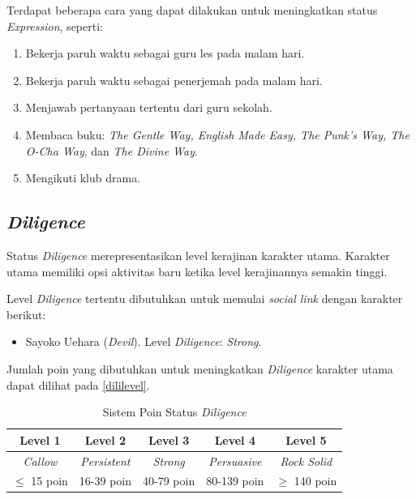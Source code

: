 Terdapat beberapa cara yang dapat dilakukan untuk meningkatkan status \textit{Expression}, seperti:
\begin{enumerate}
    \item Bekerja paruh waktu sebagai guru les pada malam hari.
    \item Bekerja paruh waktu sebagai penerjemah pada malam hari.
    \item Menjawab pertanyaan tertentu dari guru sekolah.
    \item Membaca buku: \textit{The Gentle Way, English Made Easy, The Punk’s Way, The O-Cha Way}, dan \textit{The Divine Way}.
    \item Mengikuti klub drama.
\end{enumerate}

\subsection{\textit{Diligence}}
Status \textit{Diligence} merepresentasikan level kerajinan karakter utama. Karakter utama memiliki opsi aktivitas baru ketika level kerajinannya semakin tinggi.

Level \textit{Diligence} tertentu dibutuhkan untuk memulai \textit{social link} dengan karakter berikut:
\begin{itemize}
    \item Sayoko Uehara (\textit{Devil}). Level \textit{Diligence}: \textit{Strong}.
\end{itemize}

Jumlah poin yang dibutuhkan untuk meningkatkan \textit{Diligence} karakter utama dapat dilihat pada \autoref{dililevel}.
\begin{table}[H]
    \caption{\label{dililevel}Sistem Poin Status \textit{Diligence}}
    \begin{center}
        \begin{tabular}{ | c | c | c | c | c | }
            \hline
            \textbf{Level 1} & \textbf{Level 2}    & \textbf{Level 3} & \textbf{Level 4}    & \textbf{Level 5}    \\
            \hline
            \textit{Callow}  & \textit{Persistent} & \textit{Strong}  & \textit{Persuasive} & \textit{Rock Solid} \\
            \hline
            $\le$ 15 poin    & 16-39 poin          & 40-79 poin       & 80-139 poin         & $\ge$ 140 poin      \\
            \hline
        \end{tabular}
    \end{center}
\end{table}

